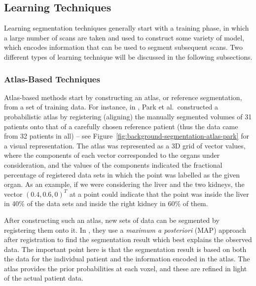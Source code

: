 \subsection{Learning Techniques}

Learning segmentation techniques generally start with a training phase, in which a large number of scans are taken and used to construct some variety of model, which encodes information that can be used to segment subsequent scans. Two different types of learning technique will be discussed in the following subsections.

\subsubsection{Atlas-Based Techniques}


Atlas-based methods start by constructing an atlas, or reference segmentation, from a set of training data. For instance, in \cite{park03}, Park et al.\ constructed a probabilistic atlas by registering (aligning) the manually segmented volumes of 31 patients onto that of a carefully chosen reference patient (thus the data came from 32 patients in all) -- see Figure~\ref{fig:background-segmentation-atlas-park} for a visual representation. The atlas was represented as a 3D grid of vector values, where the components of each vector corresponded to the organs under consideration, and the values of the components indicated the fractional percentage of registered data sets in which the point was labelled as the given organ. As an example, if we were considering the liver and the two kidneys, the vector $(0.4, 0.6, 0)^T$ at a point could indicate that the point was inside the liver in 40\% of the data sets and inside the right kidney in 60\% of them.

After constructing such an atlas, new sets of data can be segmented by registering them onto it. In \cite{park03}, they use a \emph{maximum a posteriori} (MAP) approach after registration to find the segmentation result which best explains the observed data. The important point here is that the segmentation result is based on both the data for the individual patient and the information encoded in the atlas. The atlas provides the prior probabilities at each voxel, and these are refined in light of the actual patient data.

